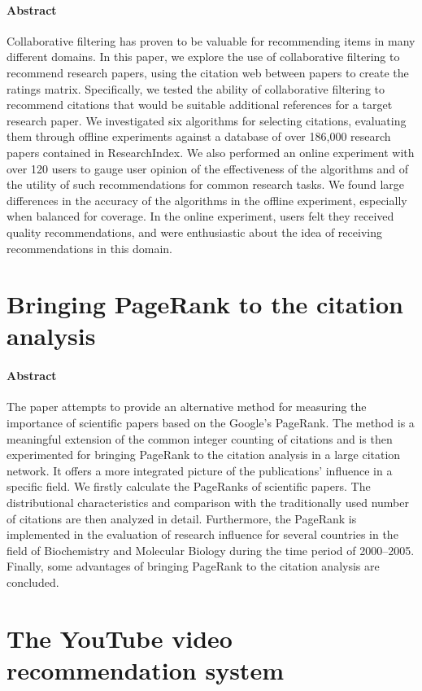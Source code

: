 \documentclass[oneside]{book}
\begin{document}
\paragraph{Abstract}
Collaborative filtering has proven to be valuable for recommending items in many different domains. In this paper, we explore the use of collaborative filtering to recommend research papers, using the citation web between papers to create the ratings matrix. Specifically, we tested the ability of collaborative filtering to recommend citations that would be suitable additional references for a target research paper. We investigated six algorithms for selecting citations, evaluating them through offline experiments against a database of over 186,000 research papers contained in ResearchIndex. We also performed an online experiment with over 120 users to gauge user opinion of the effectiveness of the algorithms and of the utility of such recommendations for common research tasks. We found large differences in the accuracy of the algorithms in the offline experiment, especially when balanced for coverage. In the online experiment, users felt they received quality recommendations, and were enthusiastic about the idea of receiving recommendations in this domain.
\section{Bringing PageRank to the citation analysis}
\paragraph{Abstract}
The paper attempts to provide an alternative method for measuring the importance of scientific papers based on the Google’s PageRank. The method is a meaningful extension of the common integer counting of citations and is then experimented for bringing PageRank to the citation analysis in a large citation network. It offers a more integrated picture of the publications’ influence in a specific field. We firstly calculate the PageRanks of scientific papers. The distributional characteristics and comparison with the traditionally used number of citations are then analyzed in detail. Furthermore, the PageRank is implemented in the evaluation of research influence for several countries in the field of Biochemistry and Molecular Biology during the time period of 2000–2005. Finally, some advantages of bringing PageRank to the citation analysis are concluded.
\section{The YouTube video recommendation system}
\end{document}
